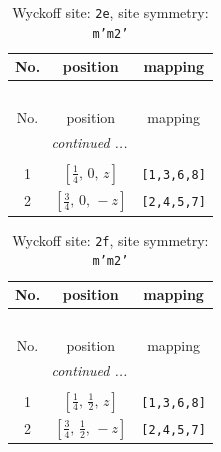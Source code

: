 \documentclass[fleqn,8pt]{jsarticle}
\begin{document}
\begin{longtable}{ccc}
\caption{Wyckoff site: {\tt 2e}, site symmetry: {\tt m'm2'}}
 \\
 \hline \hline
No. & position & mapping \\ \hline \endfirsthead

\multicolumn{2}{l}{\tablename\ \thetable{}} \\
 \hline \hline
No. & position & mapping \\ \hline \endhead

 \hline \hline
\multicolumn{2}{r}{\footnotesize\it continued ...} \\ \endfoot

 \hline \hline
\multicolumn{2}{r}{} \\ \endlastfoot

1 & $\left[ \frac{1}{4},\, 0,\, z \right]$ & {\tt [1,3,6,8]} \\ \hline
2 & $\left[ \frac{3}{4},\, 0,\, - z \right]$ & {\tt [2,4,5,7]} \\
\end{longtable}
\renewcommand{\arraystretch}{1.2}
\begin{longtable}{ccc}
\caption{Wyckoff site: {\tt 2f}, site symmetry: {\tt m'm2'}}
 \\
 \hline \hline
No. & position & mapping \\ \hline \endfirsthead

\multicolumn{2}{l}{\tablename\ \thetable{}} \\
 \hline \hline
No. & position & mapping \\ \hline \endhead

 \hline \hline
\multicolumn{2}{r}{\footnotesize\it continued ...} \\ \endfoot

 \hline \hline
\multicolumn{2}{r}{} \\ \endlastfoot

1 & $\left[ \frac{1}{4},\, \frac{1}{2},\, z \right]$ & {\tt [1,3,6,8]} \\ \hline
2 & $\left[ \frac{3}{4},\, \frac{1}{2},\, - z \right]$ & {\tt [2,4,5,7]} \\
\end{longtable}
\renewcommand{\arraystretch}{1.2}
\end{document}
